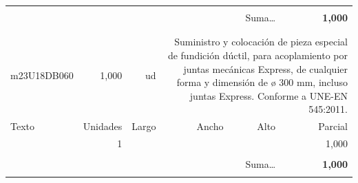 \documentclass{book}%
\begin{document}
\begin{longtable}{lrrrrr}
&&&&&\\%
\multicolumn{5}{r}{Suma\ldots}&\textbf{     1,000}\\%
\hline%
&&&&&\\%
&&&&&\\%
m23U18DB060&     1,000& ud&\multicolumn{3}{p{6cm}}{\scriptsize Suministro y colocación de pieza especial de fundición dúctil, para acoplamiento por juntas mecánicas Express, de cualquier forma y dimensión de ø 300 mm, incluso juntas Express. Conforme a UNE-EN 545:2011.\normalsize}\\%
Texto&Unidades&Largo&Ancho&Alto&Parcial\\%
\hline%
\multicolumn{1}{p{3.5cm}}{ }&1&&&&     1,000\\%
&&&&&\\%
\multicolumn{5}{r}{Suma\ldots}&\textbf{     1,000}\\%
\hline%
&&&&&\\%
\end{longtable}%
\newpage

%
\end{document}
